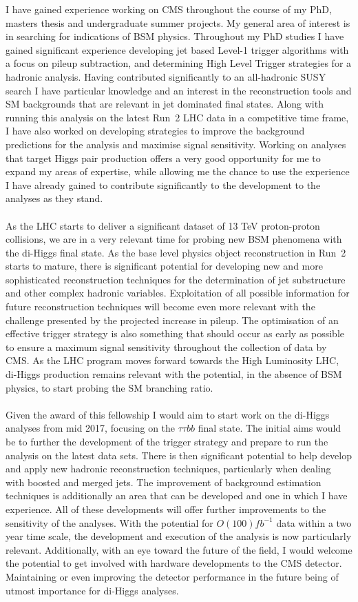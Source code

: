 \documentclass[a4paper]{moderncv}
\begin{document}
I have gained experience working on CMS throughout the course of my
PhD, masters thesis and undergraduate summer projects. My general area
of interest is in searching for indications of BSM physics. Throughout
my PhD studies I have gained significant experience developing jet
based Level-1 trigger algorithms with a focus on pileup subtraction,
and determining High Level Trigger strategies for a hadronic analysis.
Having contributed significantly to an all-hadronic SUSY search I have
particular knowledge and an interest in the reconstruction tools and
SM backgrounds that are relevant in jet dominated final states. Along
with running this analysis on the latest Run~2 LHC data in a
competitive time frame, I have also worked on developing strategies to
improve the background predictions for the analysis and maximise
signal sensitivity. Working on analyses that target Higgs pair
production offers a very good opportunity for me to expand my areas of
expertise, while allowing me the chance to use the experience I have
already gained to contribute significantly to the development to the
analyses as they stand.
\\\\
As the LHC starts to deliver a significant dataset of 13 TeV
proton-proton collisions, we are in a very relevant time for probing
new BSM phenomena with the di-Higgs final state. As the base level
physics object reconstruction in Run~2 starts to mature, there is
significant potential for developing new and more sophisticated
reconstruction techniques for the determination of jet substructure
and other complex hadronic variables. Exploitation of all possible
information for future reconstruction techniques will become even more relevant with
the challenge presented by the projected increase in pileup. The
optimisation of an effective trigger strategy is also something that
should occur as early as possible to ensure a maximum signal
sensitivity throughout the collection of data by CMS. As the LHC
program moves forward towards the High Luminosity LHC, di-Higgs
production remains relevant with the potential, in the absence of BSM
physics, to start probing the SM branching ratio.
\\\\ 
Given the award of this fellowship I would aim to start work
on the di-Higgs analyses from mid 2017, focusing on the $\tau\tau bb$
final state. The initial aims would be to further the development of
the trigger strategy and prepare to run the analysis on the latest
data sets. There is then significant potential to help
develop and apply new hadronic reconstruction techniques, particularly
when dealing with boosted and merged jets. The improvement of
background estimation techniques is additionally an area that can be
developed and one in which I have experience. All of these
developments will offer further improvements to the sensitivity of the
analyses. With the potential for $O(100) fb^{-1}$ data within a two
year time scale, the development and execution of the analysis is now
particularly relevant.  Additionally, with an eye toward the future of
the field, I would welcome the potential to get involved with hardware
developments to the CMS detector.  Maintaining or even improving the
detector performance in the future being of utmost importance for
di-Higgs analyses.
\end{document}
